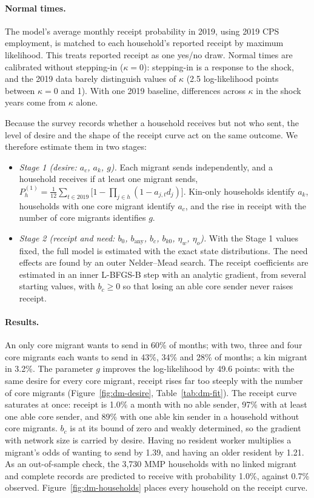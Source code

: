 \paragraph{Normal times.} The model's average monthly receipt probability in 2019, using 2019 CPS employment, is matched to each household's reported receipt by maximum likelihood. This treats reported receipt as one yes/no draw. Normal times are calibrated without stepping-in ($\kappa = 0$): stepping-in is a response to the shock, and the 2019 data barely distinguish values of $\kappa$ (2.5 log-likelihood points between $\kappa = 0$ and 1). With one 2019 baseline, differences across $\kappa$ in the shock years come from $\kappa$ alone.

Because the survey records whether a household receives but not who sent, the level of desire and the shape of the receipt curve act on the same outcome. We therefore estimate them in two stages:
\begin{itemize}
\item \emph{Stage 1 (desire: $a_c$, $a_k$, $g$).} Each migrant sends independently, and a household receives if at least one migrant sends, $P^{(1)}_h = \tfrac{1}{12}\sum_{t \in 2019}\big[1 - \prod_{j \in h}(1 - a_{j,t} d_j)\big]$. Kin-only households identify $a_k$, households with one core migrant identify $a_c$, and the rise in receipt with the number of core migrants identifies $g$.
\item \emph{Stage 2 (receipt and need: $b_0$, $b_{\mathrm{any}}$, $b_c$, $b_{k0}$, $\eta_w$, $\eta_o$).} With the Stage 1 values fixed, the full model is estimated with the exact state distributions. The need effects are found by an outer Nelder--Mead search. The receipt coefficients are estimated in an inner L-BFGS-B step with an analytic gradient, from several starting values, with $b_c \ge 0$ so that losing an able core sender never raises receipt.
\end{itemize}

\paragraph{Results.} An only core migrant wants to send in 60\% of months; with two, three and four core migrants each wants to send in 43\%, 34\% and 28\% of months; a kin migrant in 3.2\%. The parameter $g$ improves the log-likelihood by 49.6 points: with the same desire for every core migrant, receipt rises far too steeply with the number of core migrants (Figure~\ref{fig:dm-desire}, Table~\ref{tab:dm-fit}). The receipt curve saturates at once: receipt is 1.0\% a month with no able sender, 97\% with at least one able core sender, and 89\% with one able kin sender in a household without core migrants. $b_c$ is at its bound of zero and weakly determined, so the gradient with network size is carried by desire. Having no resident worker multiplies a migrant's odds of wanting to send by 1.39, and having an older resident by 1.21. As an out-of-sample check, the 3,730 MMP households with no linked migrant and complete records are predicted to receive with probability 1.0\%, against 0.7\% observed. Figure~\ref{fig:dm-households} places every household on the receipt curve.

